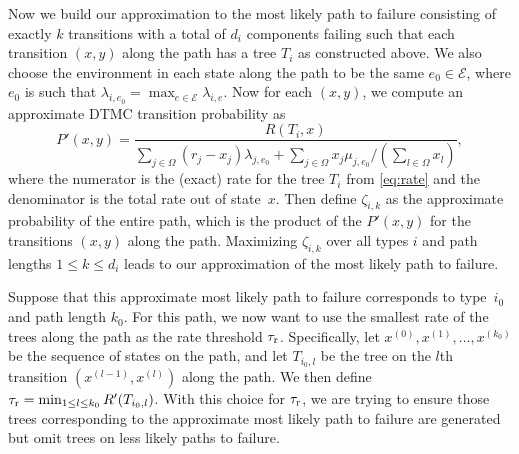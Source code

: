 \documentclass[12pt]{article}
\newcommand{\changed}[1]{#1}
\newcommand{\changed}[1]{\textcolor{red}{#1}}
\begin{document}
\changed{Now we build our approximation to the most likely path to failure
consisting of exactly $k$ transitions with a total of $d_{i}$ components
failing such that each transition $(x,y)$ along the path has a tree $T_{i}$ as
constructed above. We also choose the environment in each state along the path
to be the same $e_0 \in \mathcal{E}$, where $e_0$ is such that $\lambda_{i,
e_0} = \max_{e \in \mathcal{E}} \lambda_{i, e}$. Now for each $(x,y)$, we
compute an approximate DTMC transition probability as
$$
P'(x,y) = \frac{R(T_i,x)} {\sum_{j \in \Omega} (r_j - x_j) \lambda_{j, e_0}
+ \sum_{j \in \Omega} x_j \mu_{j,e_0}/ (\sum_{l \in \Omega} x_l)},
$$
where the numerator is the (exact) rate for the tree $T_i$ from
\eqref{eq:rate} and the denominator is the total rate out of state~$x$. Then
define $\zeta_{i, k}$ as the approximate probability of the entire path, which
is the product of the $P'(x,y)$ for the transitions $(x,y)$ along the path.
Maximizing $\zeta_{i,k}$ over all types $i$ and path lengths $1 \leq k \leq
d_{i}$ leads to our approximation of the most likely path to failure. }


\changed{
Suppose that this approximate most likely path to failure corresponds to
type~$i_0$ and path length $k_0$. For this path, we now want to use the
smallest rate of the trees along the path as the rate threshold $\tau_{\textrm
r}$. Specifically, let $x^{(0)}, x^{(1)},
\ldots, x^{(k_0)}$ be the sequence
of states on the path, and let $T_{i_0,l}$ be the tree on the $l$th transition
$(x^{(l-1)}, x^{(l)})$ along the path. We then define $\tau_{\textrm r} =
\min_{1 \leq l \leq k_0} R'(T_{i_0,l})$. With this choice for $\tau_{\textrm
r}$, we are trying to ensure those trees corresponding to the approximate most
likely path to failure are generated but omit trees on less likely paths to
failure. }
\end{document}
